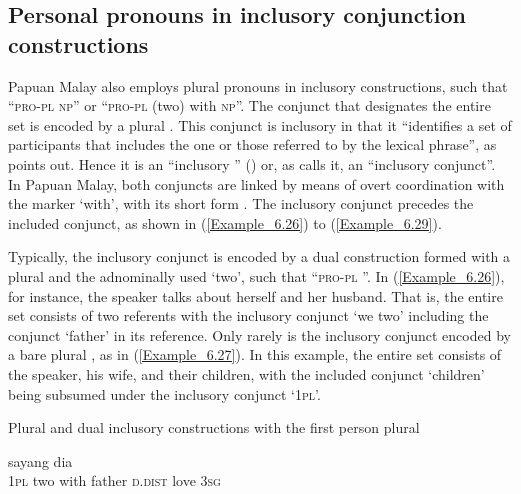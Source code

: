 \subsection{Personal pronouns in inclusory {conjunction} constructions}
\label{Para_6.1.4}
Papuan Malay also employs plural pronouns in inclusory  constructions, such that ``\textsc{pro-pl}  \textsc{np}'' or ``\textsc{pro-pl} (two) with \textsc{np}''. The conjunct that designates the entire set is encoded by a plural . This conjunct is inclusory in that it “identifies a set of participants that includes the one or those referred to by the lexical  phrase”, as \citet[1]{Lichtenberk.2000} points out.  Hence it is an “inclusory ” (\citeyear*[2]{Lichtenberk.2000}) or, as \citet[33]{Haspelmath.2007c} calls it, an “inclusory conjunct”. In Papuan Malay, both conjuncts are linked by means of overt coordination with the  marker  ‘with’, with its short form . The inclusory conjunct precedes the included conjunct, as shown in (\ref{Example_6.26}) to (\ref{Example_6.29}).



Typically, the inclusory conjunct is encoded by a dual construction formed with a plural  and the adnominally used   ‘two’, such that ``\textsc{pro-pl} ''. In (\ref{Example_6.26}), for instance, the speaker talks about herself and her husband. That is, the entire set consists of two referents with the inclusory conjunct  ‘we two’ including the conjunct  ‘father’ in its reference. Only rarely is the inclusory conjunct encoded by a bare plural , as in (\ref{Example_6.27}). In this example, the entire set consists of the speaker, his wife, and their children, with the included conjunct  ‘children’ being subsumed under the inclusory conjunct  ‘\textsc{1pl}’.



\begin{styleExampleTitle}
Plural and dual inclusory  constructions with the first person plural 
\end{styleExampleTitle}

\ea
\label{Example_6.26}
\gll {\ldots} {} {} {} {} {} {sayang} {dia}\\ %
 { }   \textsc{1pl}  two  with  father  \textsc{d.dist}  love  \textsc{3sg}\\

